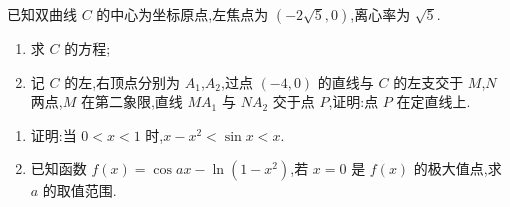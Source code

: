 \begin{problem}
已知双曲线 \(C\) 的中心为坐标原点,左焦点为 \((-2\sqrt5,0)\),离心率为 \(\sqrt5\).

\begin{enumerate}
\item 求 \(C\) 的方程;
\item 记 \(C\) 的左,右顶点分别为 \(A_1\),\(A_2\),过点 \((-4,0)\) 的直线与 \(C\) 的左支交于 \(M\),\(N\) 两点,\(M\) 在第二象限,直线 \(MA_1\) 与 \(NA_2\) 交于点 \(P\),证明:点 \(P\) 在定直线上.
\end{enumerate}
\end{problem}

\begin{problem}
\begin{enumerate}
    \item 证明:当 \(0<x<1\) 时,\(x-x^2<\sin x<x\).
    \item 已知函数 \(f(x)=\cos ax-\ln(1-x^2)\),若 \(x=0\) 是 \(f(x)\) 的极大值点,求 \(a\) 的取值范围.
\end{enumerate}
\end{problem}


